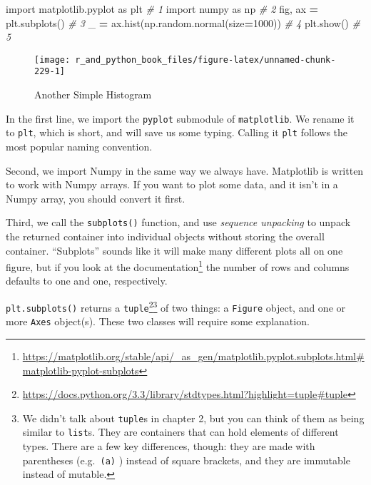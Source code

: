 \documentclass[12pt,krantz2]{krantz}
\makeatletter
\newenvironment{Shaded}{\begin{snugshade}}{\end{snugshade}}
\newcommand{\CommentTok}[1]{\textcolor[rgb]{0.37,0.37,0.37}{\textit{#1}}}
\newcommand{\DecValTok}[1]{\textcolor[rgb]{0.06,0.06,0.06}{#1}}
\newcommand{\ImportTok}[1]{#1}
\newcommand{\NormalTok}[1]{#1}
\newcommand{\OperatorTok}[1]{\textcolor[rgb]{0.43,0.43,0.43}{\textbf{#1}}}
\renewcommand{\href}[2]{#2\footnote{\url{#1}}}
\newenvironment{kframe}{%
\medskip{}
\setlength{\fboxsep}{.8em}
 \def\at@end@of@kframe{}%
 \ifinner\ifhmode%
  \def\at@end@of@kframe{\end{minipage}}%
  \begin{minipage}{\columnwidth}%
 \fi\fi%
 \def\FrameCommand##1{\hskip\@totalleftmargin \hskip-\fboxsep
 \colorbox{shadecolor}{##1}\hskip-\fboxsep
     \hskip-\linewidth \hskip-\@totalleftmargin \hskip\columnwidth}%
 \MakeFramed {\advance\hsize-\width
   \@totalleftmargin\z@ \linewidth\hsize
   \@setminipage}}%
 {\par\unskip\endMakeFramed%
 \at@end@of@kframe}
\renewenvironment{Shaded}{\begin{kframe}}{\end{kframe}}
\makeatother
\begin{document}
\begin{Shaded}
\begin{Highlighting}[]
\ImportTok{import}\NormalTok{ matplotlib.pyplot }\ImportTok{as}\NormalTok{ plt       }\CommentTok{# 1}
\ImportTok{import}\NormalTok{ numpy }\ImportTok{as}\NormalTok{ np                    }\CommentTok{# 2}
\NormalTok{fig, ax }\OperatorTok{=}\NormalTok{ plt.subplots()              }\CommentTok{# 3}
\NormalTok{_ }\OperatorTok{=}\NormalTok{ ax.hist(np.random.normal(size}\OperatorTok{=}\DecValTok{1000}\NormalTok{))  }\CommentTok{# 4}
\NormalTok{plt.show()                            }\CommentTok{# 5}
\end{Highlighting}
\end{Shaded}

\begin{figure}

{\centering \texttt{[image: r\_and\_python\_book\_files/figure-latex/unnamed-chunk-229-1]} 

}

\caption{Another Simple Histogram}\label{fig:unnamed-chunk-229}
\end{figure}

In the first line, we import the \texttt{pyplot} submodule of \texttt{matplotlib}. We rename it to \texttt{plt}, which is short, and will save us some typing. Calling it \texttt{plt} follows the most popular naming convention.

Second, we import Numpy in the same way we always have. Matplotlib is written to work with Numpy arrays. If you want to plot some data, and it isn't in a Numpy array, you should convert it first.

Third, we call the \texttt{subplots()} function, and use \emph{sequence unpacking} to unpack the returned container into individual objects without storing the overall container. ``Subplots'' sounds like it will make many different plots all on one figure, but if you look at the \href{https://matplotlib.org/stable/api/_as_gen/matplotlib.pyplot.subplots.html\#matplotlib-pyplot-subplots}{documentation} the number of rows and columns defaults to one and one, respectively.

\texttt{plt.subplots()} returns a \href{https://docs.python.org/3.3/library/stdtypes.html?highlight=tuple\#tuple}{\texttt{tuple}}\footnote{We didn't talk about \texttt{tuple}s in chapter 2, but you can think of them as being similar to \texttt{list}s. They are containers that can hold elements of different types. There are a few key differences, though: they are made with parentheses (e.g.~\texttt{(\textquotesingle{}a\textquotesingle{})} ) instead of square brackets, and they are immutable instead of mutable.} of two things: a \texttt{Figure} object, and one or more \texttt{Axes} object(s). These two classes will require some explanation.
\end{document}
